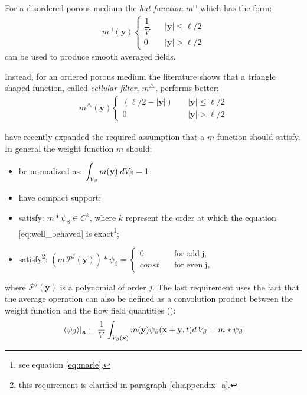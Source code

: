 For a disordered porous medium the \textit{hat function} $m^{\sqcap}$ which has the form:
\begin{eqnarray}
	m^{\sqcap}(\mathbf{y}) 
	\begin{cases}
		\dfrac{1}{V} \quad &|\mathbf{y}| \leqslant  \ell/2\\
		0 \quad &|\mathbf{y}|>  \ell/2
	\end{cases}
\end{eqnarray}
can be used to produce smooth averaged fields.

Instead, for an ordered porous medium the literature shows that a triangle shaped function, called \textit{cellular filter}, $m^{\bigtriangleup}$,  performs better:
\begin{eqnarray}
m^{\bigtriangleup}(\mathbf{y}) 
\begin{cases}
(\ell/2 - |\mathbf{y}|) \quad &|\mathbf{y}| \leqslant \ell/2\\
0 \quad &|\mathbf{y}|>  \ell/2
\end{cases}
\end{eqnarray}

\citet{davit2017technical} have recently expanded the required assumption that a $m$ function should satisfy. In general the weight function $m$ should:
\begin{itemize}
	\item be normalized as: $\displaystyle\int_{V_\beta}  m(\mathbf{y}) \; dV_\beta = 1$;
	\item have compact support;
	\item satisfy: $m*\psi_{\beta} \in C^{k}$, where $k$ represent the order at which the equation \eqref{eq:well_behaved} is exact\footnote{see equation \eqref{eq:marle}.};
	\item satisfy\footnote{this requirement is clarified in paragraph \ref{ch:appendix_a}.}: $(m \, \mathcal{P}^j(\mathbf{y}))*\psi_{\beta} = 
	\begin{cases}
	0 \quad &\textrm{for} \; \textrm{odd} \; \textrm{j},\\
	const  \quad &\textrm{for} \; \textrm{even} \; \textrm{j},
	\end{cases}$
\end{itemize}

\noindent where $\mathcal{P}^j(\mathbf{y})$ is a polynomial of order $j$.
The last requirement uses the fact that the average operation can also be defined as a convolution product between the weight function and the flow field quantities (\citet{marle1982macroscopic}):
\begin{equation}
{\left< \psi_{\beta} \right>}|_{\mathbf{x}} = \dfrac{1}{V} \int_{V_\beta(\mathbf{x})} m(\mathbf{y}) \psi_{\beta}(\mathbf{x}+\mathbf{y}, t) d \, V_\beta = m*\psi_{\beta}
\label{eq:marle}
\end{equation}

